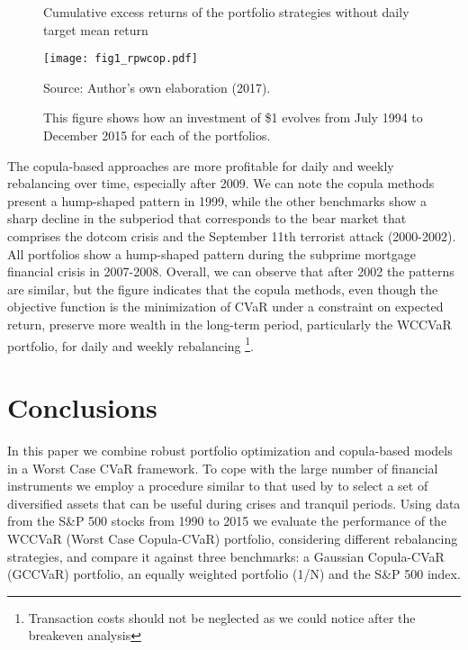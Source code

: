 \documentclass[a4paper,12pt]{report}
\begin{document}
\begin{refsection}
\begin{figure}[htbp]
	\hspace*{-2cm} 
	\caption{\scriptsize Cumulative excess returns of the portfolio strategies without daily target mean return }
	\texttt{[image: fig1\_rpwcop.pdf]}
	\captionsetup{justification=raggedright,
		singlelinecheck=false
	}
	\caption*{Source: Author's own elaboration (2017).}
	\caption*{This figure shows how an investment of \$1 evolves from July 1994 to December 2015 for each of the portfolios.}
	\label{fig:fig01}
\end{figure}

The copula-based approaches are more profitable for daily and weekly rebalancing over time, especially after 2009. We can note the copula methods present a hump-shaped pattern in 1999, while the other benchmarks show a sharp decline in the subperiod that corresponds to the bear market that comprises the dotcom crisis and the September 11th terrorist attack (2000-2002). All portfolios show a hump-shaped pattern during the subprime mortgage financial crisis in 2007-2008. Overall, we can observe that after 2002 the patterns are similar, but the figure indicates that the copula methods, even though the objective function is the minimization of CVaR under a constraint on expected return, preserve more wealth in the long-term period, particularly the WCCVaR portfolio, for daily and weekly rebalancing \footnote{Transaction costs should not be neglected as we could notice after the breakeven analysis}.



\vspace{0.3cm}


\section{Conclusions}

In this paper we combine robust portfolio optimization and copula-based models in a Worst Case CVaR framework. To cope with the large number of financial instruments we employ a procedure similar to that used by \citet*{ggr06} to select a set of diversified assets that can be useful during crises and tranquil periods. Using data from the S\&P 500 stocks from 1990 to 2015 we evaluate the performance of the WCCVaR (Worst Case Copula-CVaR) portfolio, considering different rebalancing strategies, and compare it against three benchmarks: a Gaussian Copula-CVaR (GCCVaR) portfolio, an equally weighted portfolio (1/N) and the S\&P 500 index. 


\end{refsection}
\end{document}
